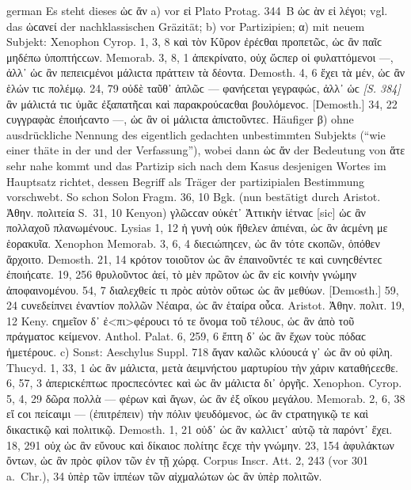 \begin{otherlanguage*}{german}
Es steht dieses ὡϲ ἄν a) vor εἰ Plato Protag. 344~B ὡϲ ὰν εἰ λέγοι; vgl. das ὡϲανεί der nachklassischen Gräzität; b) vor Partizipien; α) mit neuem Subjekt: Xenophon Cyrop. 1, 3, 8 καὶ τὸν Κῦρον ἐρέϲθαι προπετῶϲ, ὡϲ ἂν παῖϲ μηδέπω ὑποπτήϲϲων. Memorab. 3, 8, 1 ἀπεκρίνατο, οὐχ ὥϲπερ οἱ φυλαττόμενοι —, ἀλλ᾽ ὡϲ ἂν πεπειϲμένοι μάλιϲτα πράττειν τὰ δέοντα. Demosth. 4, 6 ἔχει τὰ μέν, ὡϲ ἂν ἑλών τιϲ πολέμῳ. 24, 79 οὐδὲ ταῦθ᾽ ἁπλῶϲ — φανήϲεται γεγραφώϲ, ἀλλ᾽ ὡϲ \hypertarget{p384}{\emph{[S. 384]}}\label{p384} ἂν μάλιϲτά τιϲ ὑμᾶϲ ἐξαπατῆϲαι καὶ παρακρούϲαϲθαι βουλόμενοϲ. [Demosth.] 34, 22 ϲυγγραφὰϲ ἐποιήϲαντο —, ὡϲ ἂν οἱ μάλιϲτα ἀπιϲτοῦντεϲ. Häufiger β) ohne ausdrückliche Nennung des eigentlich gedachten unbestimmten Subjekts (“wie einer thäte in der und der Verfassung”), wobei dann ὡϲ ἄν der Bedeutung von ἅτε sehr nahe kommt und das Partizip sich nach dem Kasus desjenigen Wortes im Hauptsatz richtet, dessen Begriff als Träger der partizipialen Bestimmung vorschwebt. So schon Solon Fragm. 36, 10 Bgk. (nun bestätigt durch Aristot. Ἀθην. πολιτεία S.~31, 10 Kenyon) γλῶϲϲαν οὐκέτ᾽ Ἀττικὴν ἱέτναϲ [sic] ὡϲ ἂν πολλαχοῦ πλανωμένουϲ. Lysias 1, 12 ἡ γυνὴ οὐκ ἤθελεν ἀπιέναι, ὡϲ ἂν ἀϲμένη με ἑορακυῖα. Xenophon Memorab. 3, 6, 4 διεϲιώπηϲεν, ὡϲ ἂν τότε ϲκοπῶν, ὁπόθεν ἄρχοιτο. Demosth. 21, 14 κρότον τοιοῦτον ὡϲ ἂν ἐπαινοῦντέϲ τε καὶ ϲυνηϲθέντεϲ ἐποιήϲατε. 19, 256 θρυλοῦντοϲ ἀεί, τὸ μὲν πρῶτον ὡϲ ἂν εἰϲ κοινὴν γνώμην ἀποφαινομένου. 54, 7 διαλεχθείϲ τι πρὸϲ αὑτὸν οὕτωϲ ὡϲ ἂν μεθύων. [Demosth.] 59, 24 ϲυνεδείπνει ἐναντίον πολλῶν Νέαιρα, ὡϲ ἂν ἑταίρα οὖϲα. Aristot. Ἀθην. πολιτ. 19, 12 Keny. ϲημεῖον δ᾽ ἐ<πι>φέρουϲι τό τε ὄνομα τοῦ τέλουϲ, ὡϲ ἂν ἀπὸ τοῦ πράγματοϲ κείμενον. Anthol. Palat. 6, 259, 6 ἔπτη δ᾽ ὡϲ ἂν ἔχων τοὺϲ πόδαϲ ἡμετέρουϲ. c) Sonst: Aeschylus Suppl. 718 ἄγαν καλῶϲ κλύουϲά γ᾽ ὡϲ ἂν οὐ φίλη. Thucyd. 1, 33, 1 ὡϲ ἂν μάλιϲτα, μετὰ ἀειμνήϲτου μαρτυρίου τὴν χάριν καταθήϲεϲθε. 6, 57, 3 ἀπεριϲκέπτωϲ προϲπεϲόντεϲ καὶ ὡϲ ἂν μάλιϲτα δι᾽ ὀργῆϲ. Xenophon. Cyrop. 5, 4, 29 δῶρα πολλὰ — φέρων καὶ ἄγων, ὡϲ ἂν ἐξ οἴκου μεγάλου. Memorab. 2, 6, 38 εἴ ϲοι πείϲαιμι — (ἐπιτρέπειν) τὴν πόλιν ψευδόμενοϲ, ὡϲ ἂν ϲτρατηγικῷ τε καὶ δικαϲτικῷ καὶ πολιτικῷ. Demosth. 1, 21 οὐδ᾽ ὡϲ ἂν καλλιϲτ᾽ αὐτῷ τὰ παρόντ᾽ ἔχει. 18, 291 οὐχ ὡϲ ἂν εὔνουϲ καὶ δίκαιοϲ πολίτηϲ ἔϲχε τὴν γνώμην. 23, 154 ἀφυλάκτων ὄντων, ὡϲ ἂν πρὸϲ φίλον τῶν ἐν τῇ χώρᾳ. Corpus Inscr. Att. 2, 243 (vor 301 a.~Chr.), 34 ὑπὲρ τῶν ἱππέων τῶν αἰχμαλώτων ὡϲ ἂν ὑπὲρ πολιτῶν.


\end{otherlanguage*}

